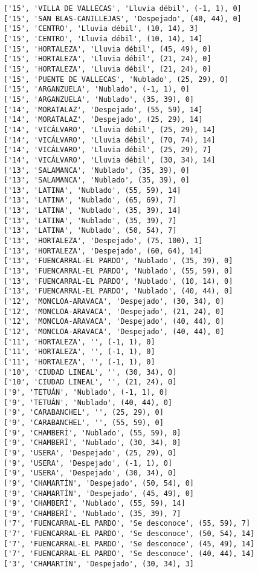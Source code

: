 \documentclass[11pt]{article}
\begin{document}
\begin{Verbatim}[commandchars=\\\{\}]
['15', 'VILLA DE VALLECAS', 'Lluvia débil', (-1, 1), 0]
['15', 'SAN BLAS-CANILLEJAS', 'Despejado', (40, 44), 0]
['15', 'CENTRO', 'Lluvia débil', (10, 14), 3]
['15', 'CENTRO', 'Lluvia débil', (10, 14), 14]
['15', 'HORTALEZA', 'Lluvia débil', (45, 49), 0]
['15', 'HORTALEZA', 'Lluvia débil', (21, 24), 0]
['15', 'HORTALEZA', 'Lluvia débil', (21, 24), 0]
['15', 'PUENTE DE VALLECAS', 'Nublado', (25, 29), 0]
['15', 'ARGANZUELA', 'Nublado', (-1, 1), 0]
['15', 'ARGANZUELA', 'Nublado', (35, 39), 0]
['14', 'MORATALAZ', 'Despejado', (55, 59), 14]
['14', 'MORATALAZ', 'Despejado', (25, 29), 14]
['14', 'VICÁLVARO', 'Lluvia débil', (25, 29), 14]
['14', 'VICÁLVARO', 'Lluvia débil', (70, 74), 14]
['14', 'VICÁLVARO', 'Lluvia débil', (25, 29), 7]
['14', 'VICÁLVARO', 'Lluvia débil', (30, 34), 14]
['13', 'SALAMANCA', 'Nublado', (35, 39), 0]
['13', 'SALAMANCA', 'Nublado', (35, 39), 0]
['13', 'LATINA', 'Nublado', (55, 59), 14]
['13', 'LATINA', 'Nublado', (65, 69), 7]
['13', 'LATINA', 'Nublado', (35, 39), 14]
['13', 'LATINA', 'Nublado', (35, 39), 7]
['13', 'LATINA', 'Nublado', (50, 54), 7]
['13', 'HORTALEZA', 'Despejado', (75, 100), 1]
['13', 'HORTALEZA', 'Despejado', (60, 64), 14]
['13', 'FUENCARRAL-EL PARDO', 'Nublado', (35, 39), 0]
['13', 'FUENCARRAL-EL PARDO', 'Nublado', (55, 59), 0]
['13', 'FUENCARRAL-EL PARDO', 'Nublado', (10, 14), 0]
['13', 'FUENCARRAL-EL PARDO', 'Nublado', (40, 44), 0]
['12', 'MONCLOA-ARAVACA', 'Despejado', (30, 34), 0]
['12', 'MONCLOA-ARAVACA', 'Despejado', (21, 24), 0]
['12', 'MONCLOA-ARAVACA', 'Despejado', (40, 44), 0]
['12', 'MONCLOA-ARAVACA', 'Despejado', (40, 44), 0]
['11', 'HORTALEZA', '', (-1, 1), 0]
['11', 'HORTALEZA', '', (-1, 1), 0]
['11', 'HORTALEZA', '', (-1, 1), 0]
['10', 'CIUDAD LINEAL', '', (30, 34), 0]
['10', 'CIUDAD LINEAL', '', (21, 24), 0]
['9', 'TETUÁN', 'Nublado', (-1, 1), 0]
['9', 'TETUÁN', 'Nublado', (40, 44), 0]
['9', 'CARABANCHEL', '', (25, 29), 0]
['9', 'CARABANCHEL', '', (55, 59), 0]
['9', 'CHAMBERÍ', 'Nublado', (55, 59), 0]
['9', 'CHAMBERÍ', 'Nublado', (30, 34), 0]
['9', 'USERA', 'Despejado', (25, 29), 0]
['9', 'USERA', 'Despejado', (-1, 1), 0]
['9', 'USERA', 'Despejado', (30, 34), 0]
['9', 'CHAMARTÍN', 'Despejado', (50, 54), 0]
['9', 'CHAMARTÍN', 'Despejado', (45, 49), 0]
['9', 'CHAMBERÍ', 'Nublado', (55, 59), 14]
['9', 'CHAMBERÍ', 'Nublado', (35, 39), 7]
['7', 'FUENCARRAL-EL PARDO', 'Se desconoce', (55, 59), 7]
['7', 'FUENCARRAL-EL PARDO', 'Se desconoce', (50, 54), 14]
['7', 'FUENCARRAL-EL PARDO', 'Se desconoce', (45, 49), 14]
['7', 'FUENCARRAL-EL PARDO', 'Se desconoce', (40, 44), 14]
['3', 'CHAMARTÍN', 'Despejado', (30, 34), 3]

\end{Verbatim}
\end{document}
